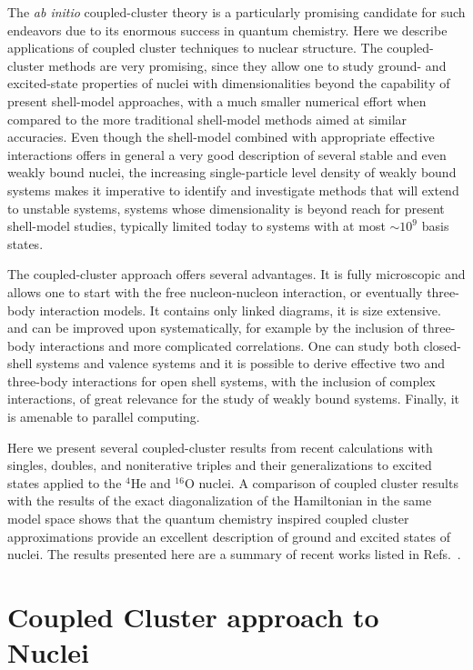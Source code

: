 \documentclass{ws-procs9x6}
\begin{document}
The {\it ab initio} coupled-cluster theory is a particularly promising
candidate for such endeavors due to its enormous success in quantum
chemistry. Here we  describe applications of 
coupled cluster techniques to
nuclear structure. The coupled-cluster methods are
very promising, since they allow one to study ground- and 
excited-state properties
of nuclei
with dimensionalities beyond the capability of present shell-model
approaches, with a much smaller numerical effort when compared to
the more traditional shell-model methods aimed at similar accuracies.
Even though the shell-model combined with appropriate effective interactions
offers in general a very good description of several stable and even weakly bound nuclei, the increasing single-particle level density of weakly bound systems
makes it imperative to 
identify and investigate methods that will extend to unstable systems,
systems whose dimensionality is beyond reach for present shell-model studies, 
typically limited today to  systems with at most $\sim 10^9$ basis states.

The coupled-cluster approach offers several advantages. 
It is fully microscopic and allows one to start with the free nucleon-nucleon interaction, or eventually three-body interaction models.
It contains only linked diagrams, it is size extensive.
and can be improved upon systematically, for example by the inclusion of 
three-body interactions and more complicated correlations. 
One can study both closed-shell systems 
and valence systems and it is possible to derive effective two and three-body 
interactions for open shell systems, with the inclusion of 
complex interactions, 
of great relevance for the study of weakly bound systems. Finally, 
it is amenable to parallel computing.

Here we present several coupled-cluster 
results from recent calculations with singles,
doubles, and noniterative triples and their generalizations to
excited states applied to the $^4$He and $^{16}$O nuclei. A comparison
of coupled cluster results with the results of the exact
diagonalization of the Hamiltonian in the same model space shows that
the quantum chemistry inspired coupled cluster approximations provide
an excellent description of ground and excited states of nuclei.
The results presented here are a summary of recent works 
listed in Refs.~\cite{ref1,ref2}. 

\section{Coupled Cluster approach to Nuclei }
\end{document}
